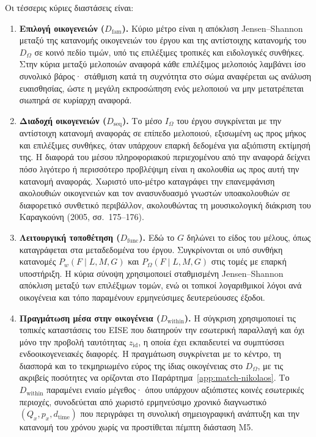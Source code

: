 \documentclass[11pt,a4paper]{article}
\begin{document}
Οι τέσσερις κύριες διαστάσεις είναι:
\begin{enumerate}[label=\textbf{\arabic*.},leftmargin=2.2em]
\item \textbf{Επιλογή οικογενειών ($D_{\mathrm{fam}}$).} Κύριο μέτρο είναι η απόκλιση Jensen--Shannon μεταξύ της κατανομής οικογενειών του έργου και της αντίστοιχης κατανομής του $D_{\Omega}$ σε κοινό πεδίο τιμών, υπό τις επιλέξιμες τροπικές και ειδολογικές συνθήκες. Στην κύρια μεταξύ μελοποιών αναφορά κάθε επιλέξιμος μελοποιός λαμβάνει ίσο συνολικό βάρος· στάθμιση κατά τη συχνότητα στο σώμα αναφέρεται ως ανάλυση ευαισθησίας, ώστε η μεγάλη εκπροσώπηση ενός μελοποιού να μην μετατρέπεται σιωπηρά σε κυρίαρχη αναφορά.
\item \textbf{Διαδοχή οικογενειών ($D_{\mathrm{seq}}$).} Το μέσο $I_{\Omega}$ του έργου συγκρίνεται με την αντίστοιχη κατανομή αναφοράς σε επίπεδο μελοποιού, εξισωμένη ως προς μήκος και επιλέξιμες συνθήκες, όταν υπάρχουν επαρκή δεδομένα για αξιόπιστη εκτίμησή της. Η διαφορά του μέσου πληροφοριακού περιεχομένου από την αναφορά δείχνει πόσο λιγότερο ή περισσότερο προβλέψιμη είναι η ακολουθία ως προς αυτή την κατανομή αναφοράς. Χωριστό υπο-μέτρο καταγράφει την επανεμφάνιση ακολουθιών οικογενειών και τον ανασυνδυασμό γνωστών υποακολουθιών σε διαφορετικό συνθετικό περιβάλλον, ακολουθώντας τη μουσικολογική διάκριση του Καραγκούνη (2005, σσ.~175--176).
\item \textbf{Λειτουργική τοποθέτηση ($D_{\mathrm{func}}$).} Εδώ το $G$ δηλώνει το είδος του μέλους, όπως καταγράφεται στα μεταδεδομένα του έργου. Συγκρίνονται οι υπό συνθήκη κατανομές $P_w(F\mid L,M,G)$ και $P_{\Omega}(F\mid L,M,G)$ στις τομές με επαρκή υποστήριξη. Η κύρια σύνοψη χρησιμοποιεί σταθμισμένη Jensen--Shannon απόκλιση μεταξύ των επιλέξιμων τομών, ενώ οι τοπικοί λογαριθμικοί λόγοι ανά οικογένεια και τόπο παραμένουν ερμηνεύσιμες δευτερεύουσες έξοδοι.
\item \textbf{Πραγμάτωση μέσα στην οικογένεια ($D_{\mathrm{within}}$).} Η σύγκριση χρησιμοποιεί τις τοπικές καταστάσεις του EISE που διατηρούν την εσωτερική παραλλαγή και όχι μόνο την προβολή ταυτότητας $z_{\mathrm{id}}$, η οποία έχει εκπαιδευτεί να συμπτύσσει ενδοοικογενειακές διαφορές. Η πραγμάτωση συγκρίνεται με το κέντρο, τη διασπορά και το τεκμηριωμένο εύρος της ίδιας οικογένειας στο $D_{\Omega}$, με τις ακριβείς ποσότητες να ορίζονται στο Παράρτημα~\ref{app:match-nikolaos}. Το $D_{\mathrm{within}}$ παραμένει ενιαίο μέγεθος· όπου υπάρχουν αξιόπιστες κοινές εσωτερικές περιοχές, συνοδεύεται από χωριστό ερμηνεύσιμο χρονικό διαγνωστικό $(Q_x,p_x,d_{\mathrm{time}})$ που περιγράφει τη συνολική σημειογραφική ανάπτυξη και την κατανομή του χρόνου χωρίς να προστίθεται πέμπτη διάσταση M5.


\end{enumerate}
\end{document}
